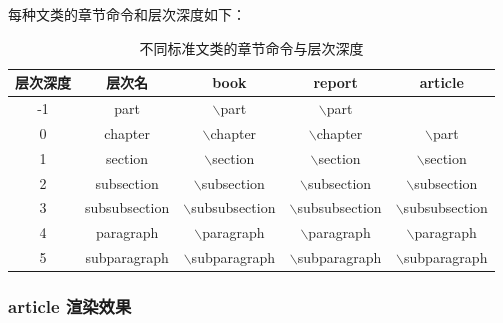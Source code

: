 \documentclass[UTF8,AutoFakeBold]{ctexart}
\numberwithin{figure}{section}
\numberwithin{table}{section}
\begin{document}
每种文类的章节命令和层次深度如下：


\begin{table}[htbp]
    \centering
    \begin{tabular}{|c|c|c|c|c|}
        \hline
        层次深度 & 层次名        & book                      & report                    & article                   \\
        \hline
        -1       & part          & $\backslash$part          & $\backslash$part          &                           \\
        \hline
        0        & chapter       & $\backslash$chapter       & $\backslash$chapter       & $\backslash$part          \\
        1        & section       & $\backslash$section       & $\backslash$section       & $\backslash$section       \\
        2        & subsection    & $\backslash$subsection    & $\backslash$subsection    & $\backslash$subsection    \\
        3        & subsubsection & $\backslash$subsubsection & $\backslash$subsubsection & $\backslash$subsubsection \\
        4        & paragraph     & $\backslash$paragraph     & $\backslash$paragraph     & $\backslash$paragraph     \\
        5        & subparagraph  & $\backslash$subparagraph  & $\backslash$subparagraph  & $\backslash$subparagraph  \\
        \hline
    \end{tabular}
    \caption{不同标准文类的章节命令与层次深度}
    \label{tab:typeoflatex}
\end{table}


\subsubsection{article 渲染效果}
\end{document}
